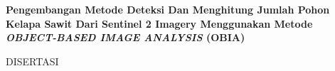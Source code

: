 \newpage
{}

\begin{center}

\begin{figure}[h]
\end{figure}

\vspace{1.0cm}
{\fontsize{12}{48} \selectfont \textbf{Pengembangan Metode Deteksi Dan Menghitung Jumlah Pohon Kelapa Sawit Dari Sentinel 2 Imagery Menggunakan Metode \textit{OBJECT-BASED IMAGE ANALYSIS} (OBIA)}}\\


\vspace{1cm}

{\large DISERTASI}


\end{center}
